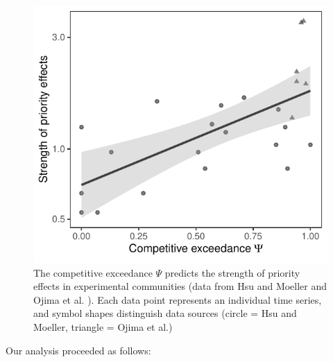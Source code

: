 \documentclass[12pt, class=article, crop=false]{standalone}
\begin{document}
\begin{figure}
    \includegraphics[scale=0.75]{output/figure_exp.pdf}
    \caption{The competitive exceedance $\Psi$ predicts the strength of priority effects in experimental communities (data from Hsu and Moeller \citep{hsu_metabolic_2021} and Ojima et al. \citep{ojima_priority_2022}).
    Each data point represents an individual time series, and symbol shapes distinguish data sources (circle = Hsu and Moeller, triangle = Ojima et al.)}
    \label{fig:experiment}
\end{figure}

Our analysis proceeded as follows:
\end{document}
